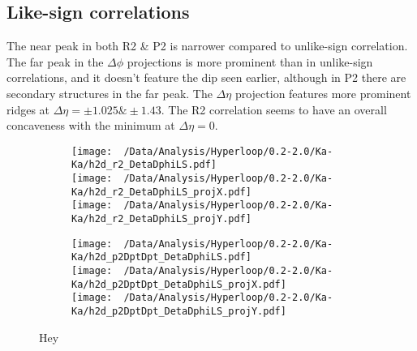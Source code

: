 \documentclass[12pt,a4paper,twoside]{report}
\begin{document}
\subsection{Like-sign correlations}
The near peak in both R2 \& P2 is narrower compared to unlike-sign correlation. The far peak in the $\Delta\phi$ projections is more prominent than in unlike-sign correlations, and it doesn't feature the dip seen earlier, although in P2 there are secondary structures in the far peak. The $\Delta\eta$ projection features more prominent ridges at $\Delta\eta=\pm1.025\&\pm1.43$. The R2 correlation seems to have an overall concaveness with the minimum at $\Delta\eta=0$.
\begin{figure}[H]
	\begin{subfigure}{0.49\linewidth}
		\texttt{[image: ~/Data/Analysis/Hyperloop/0.2-2.0/Ka-Ka/h2d\_r2\_DetaDphiLS.pdf]}\\
		\texttt{[image: ~/Data/Analysis/Hyperloop/0.2-2.0/Ka-Ka/h2d\_r2\_DetaDphiLS\_projX.pdf]}\\
		\texttt{[image: ~/Data/Analysis/Hyperloop/0.2-2.0/Ka-Ka/h2d\_r2\_DetaDphiLS\_projY.pdf]}\\
	\end{subfigure}
	\begin{subfigure}{0.49\linewidth}
		\texttt{[image: ~/Data/Analysis/Hyperloop/0.2-2.0/Ka-Ka/h2d\_p2DptDpt\_DetaDphiLS.pdf]}\\
		\texttt{[image: ~/Data/Analysis/Hyperloop/0.2-2.0/Ka-Ka/h2d\_p2DptDpt\_DetaDphiLS\_projX.pdf]}\\
		\texttt{[image: ~/Data/Analysis/Hyperloop/0.2-2.0/Ka-Ka/h2d\_p2DptDpt\_DetaDphiLS\_projY.pdf]}\\
	\end{subfigure}
	\caption{Hey}
\end{figure}
\end{document}
